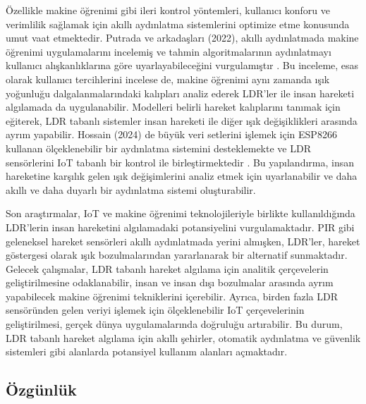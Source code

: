 Özellikle makine öğrenimi gibi ileri kontrol yöntemleri, kullanıcı konforu ve verimlilik sağlamak için akıllı aydınlatma sistemlerini optimize etme konusunda umut vaat etmektedir. Putrada ve arkadaşları (2022), akıllı aydınlatmada makine öğrenimi uygulamalarını incelemiş ve tahmin algoritmalarının aydınlatmayı kullanıcı alışkanlıklarına göre uyarlayabileceğini vurgulamıştır \cite{putrada2022machine}. Bu inceleme, esas olarak kullanıcı tercihlerini incelese de, makine öğrenimi aynı zamanda ışık yoğunluğu dalgalanmalarındaki kalıpları analiz ederek LDR'ler ile insan hareketi algılamada da uygulanabilir. Modelleri belirli hareket kalıplarını tanımak için eğiterek, LDR tabanlı sistemler insan hareketi ile diğer ışık değişiklikleri arasında ayrım yapabilir. Hossain (2024) de büyük veri setlerini işlemek için ESP8266 kullanan ölçeklenebilir bir aydınlatma sistemini desteklemekte ve LDR sensörlerini IoT tabanlı bir kontrol ile birleştirmektedir \cite{10596146}. Bu yapılandırma, insan hareketine karşılık gelen ışık değişimlerini analiz etmek için uyarlanabilir ve daha akıllı ve daha duyarlı bir aydınlatma sistemi oluşturabilir.



Son araştırmalar, IoT ve makine öğrenimi teknolojileriyle birlikte kullanıldığında LDR'lerin insan hareketini algılamadaki potansiyelini vurgulamaktadır. PIR gibi geleneksel hareket sensörleri akıllı aydınlatmada yerini almışken, LDR'ler, hareket göstergesi olarak ışık bozulmalarından yararlanarak bir alternatif sunmaktadır. Gelecek çalışmalar, LDR tabanlı hareket algılama için analitik çerçevelerin geliştirilmesine odaklanabilir, insan ve insan dışı bozulmalar arasında ayrım yapabilecek makine öğrenimi tekniklerini içerebilir. Ayrıca, birden fazla LDR sensöründen gelen veriyi işlemek için ölçeklenebilir IoT çerçevelerinin geliştirilmesi, gerçek dünya uygulamalarında doğruluğu artırabilir. Bu durum, LDR tabanlı hareket algılama için akıllı şehirler, otomatik aydınlatma ve güvenlik sistemleri gibi alanlarda potansiyel kullanım alanları açmaktadır.




\subsection{Özgünlük}

\begin{comment}
Çalışmamızın özgünlüğü, LDR kullanılarak yapılan bir kisi tespit modülünün olmamasıdır. Genelde kisi tespitinde RFID kartlar kullanılarak önceden kodlanmış şifre-anahtar çiftleri oluşturulur ve bu sistemlerin tanıyabileceği kişi sayısı, sistemin kurulumu ve güncellenmesi anındaki kişilerle sınırlıdır. Bu projede ise hem derin öğrenme temelli yapay zeka kullanılarak yeni teknolojiler literatüre kazandırılmış hem de modül derin öğrenme ile çalıştığı için yeni bir çevrede de zamanla daha yüksek bir doğruluk seviyesine ulaşacak şekilde kişi tespiti yapabilir hale olacaktır.
\end{comment}

